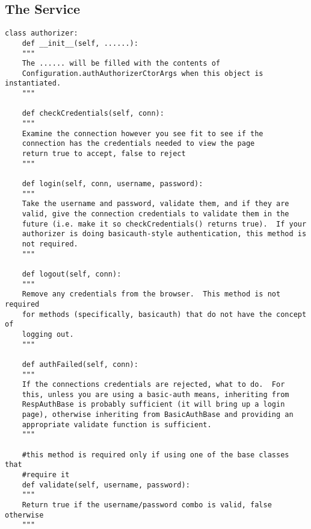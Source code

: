 \documentclass{manual}
\begin{document}
\subsection{The  Service}
\begin{verbatim}
class authorizer:
    def __init__(self, ......):
    """
    The ...... will be filled with the contents of
    Configuration.authAuthorizerCtorArgs when this object is instantiated.
    """

    def checkCredentials(self, conn):
    """
    Examine the connection however you see fit to see if the
    connection has the credentials needed to view the page
    return true to accept, false to reject
    """

    def login(self, conn, username, password):
    """
    Take the username and password, validate them, and if they are
    valid, give the connection credentials to validate them in the
    future (i.e. make it so checkCredentials() returns true).  If your
    authorizer is doing basicauth-style authentication, this method is
    not required.
    """

    def logout(self, conn):
    """
    Remove any credentials from the browser.  This method is not required
    for methods (specifically, basicauth) that do not have the concept of
    logging out.
    """

    def authFailed(self, conn):
    """
    If the connections credentials are rejected, what to do.  For
    this, unless you are using a basic-auth means, inheriting from
    RespAuthBase is probably sufficient (it will bring up a login
    page), otherwise inheriting from BasicAuthBase and providing an
    appropriate validate function is sufficient.
    """

    #this method is required only if using one of the base classes that
    #require it
    def validate(self, username, password):
    """
    Return true if the username/password combo is valid, false otherwise
    """


\end{verbatim}
\end{document}
